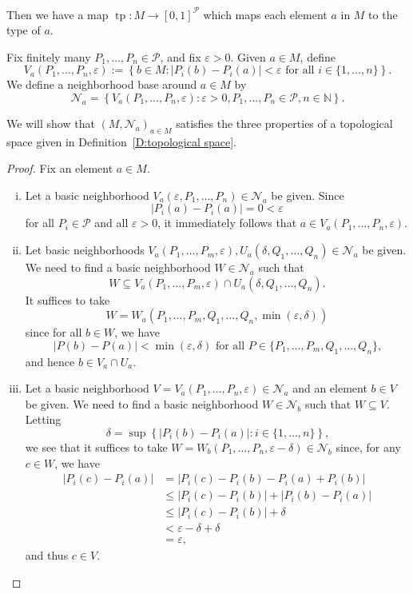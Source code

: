 \documentclass{scrartcl}
\begin{document}
\begin{example}
\begin{enumerate}[(a)]
Then we have a map $\operatorname{tp} \colon M\to [0,1]^\mathscr{P}$ which maps each element $a$ in $M$ to the type of $a$.

Fix finitely many $P_1,\dots,P_n\in\mathscr{P}$, and fix $\varepsilon > 0$. Given $a\in M$, define 
\[
V_a(P_1,\dots, P_n,\varepsilon):= \left\{b\in M \colon |P_i(b)-P_i(a)|<\varepsilon \text{ for all } i\in \{ 1,\dots, n\} \right\} \text{.}
\]
We define a neighborhood base around $a\in M$ by 
\[
\mathscr{N}_a = \left\{ V_a(P_1,\dots, P_n,\varepsilon) \colon \varepsilon >0, P_1,\dots,P_n\in\mathscr{P}, n\in\mathbb{N} \right\}\text{.}
\]

We will show that $(M,\mathscr{N}_a)_{a\in M}$ satisfies the three properties of a topological space given in Definition~\ref{D:topological space}.

\begin{proof} Fix an element $a\in M$.

\begin{enumerate}[i)]

\item Let a basic neighborhood $V_a(\varepsilon, P_1,\dots, P_n)\in\mathscr{N}_a$ be given. Since \[|P_i(a)-P_i(a)| = 0 <\varepsilon\] for all $P_i\in \mathscr{P}$ and all $\varepsilon > 0$, it immediately follows that $a\in V_a(P_1,\dots, P_n,\varepsilon)$.

\item Let basic neighborhoods $V_a(P_1,\dots, P_m,\varepsilon), U_a(\delta, Q_1,\dots, Q_n) \in\mathscr{N}_a$ be given. We need to find a basic neighborhood $W\in \mathscr{N}_a$ such that \[
W \subseteq V_a(P_1,\dots, P_m, \varepsilon) \cap U_a(\delta, Q_1,\dots, Q_n) \text{.}
\]
It suffices to take 
\[
W = W_a(P_1,\dots, P_m, Q_1,\dots, Q_n,\min(\varepsilon,\delta))
\]
since for all $b\in W$, we have \[
|P(b)-P(a)|<\min(\varepsilon,\delta) \text{ for all } P\in\{P_1,\dots, P_m, Q_1,\dots, Q_n\}\text{,}
\]
and hence $b\in V_a\cap U_a$.

\item Let a basic neighborhood $V= V_a(P_1,\dots, P_n,\varepsilon)\in\mathscr{N}_a$ and an element $b\in V$ be given. We need to find a basic neighborhood $W\in \mathscr{N}_b$ such that $W \subseteq V$.
Letting 
\[
\delta = \sup\left\{|P_i(b)-P_i(a)|\colon i\in\{1,\dots,n\}\right\}\text{,}
\]
we see that it suffices to take $W = W_b(P_1,\dots, P_n,\varepsilon -\delta)\in\mathscr{N}_b$ since, for any $c\in W$, we have
\begin{align*}
|P_i(c)-P_i(a)| &= |P_i(c)-P_i(b)-P_i(a)+P_i(b)| \\
&\leq |P_i(c)-P_i(b)| + |P_i(b)-P_i(a)| \tag{By the Triangle Inequality} \\
&\leq |P_i(c)-P_i(b)| + \delta\\
&< \varepsilon - \delta +\delta\\
&= \varepsilon\text{,}
\end{align*}
and thus $c\in V$.


\end{enumerate}
\end{proof}
\end{enumerate}
\end{example}
\end{document}
